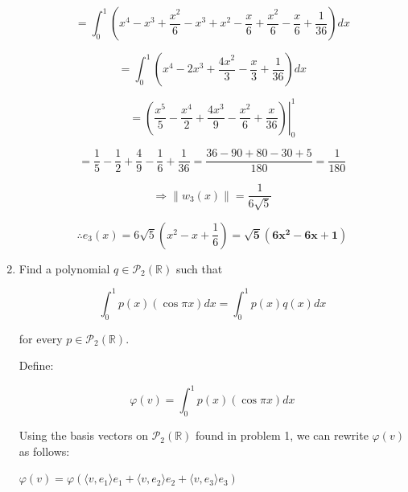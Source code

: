 \documentclass[fleqn]{article}
\newcommand{\norm}[1]{\left \lVert #1 \right \rVert}
\begin{document}
\begin{enumerate}[nolistsep]
		\begin{equation*}
			= \int_{0}^{1}{\left(x^4 - x^3 + \frac{x^2}{6} - x^3 + x^2 - \frac{x}{6} + \frac{x^2}{6} - \frac{x}{6} + \frac{1}{36}\right)dx}
		\end{equation*}
		
		\begin{equation*}
			= \int_{0}^{1}{\left(x^4 - 2x^3 + \frac{4x^2}{3} - \frac{x}{3} + \frac{1}{36}\right)dx}
		\end{equation*}
		
		\begin{equation*}
			= \left.\left(\frac{x^5}{5} - \frac{x^4}{2} + \frac{4x^3}{9} - \frac{x^2}{6} + \frac{x}{36}\right)\right\vert_{0}^{1}
		\end{equation*}
		
		\begin{equation*}
			= \frac{1}{5} - \frac{1}{2} + \frac{4}{9} - \frac{1}{6} + \frac{1}{36} = \frac{36 - 90 + 80 - 30 + 5}{180} = \frac{1}{180}
		\end{equation*}
		
		\begin{equation*}
			\Rightarrow \norm{w_3(x)} = \frac{1}{6\sqrt{5}}
		\end{equation*}
		
		\begin{equation*}
			\therefore e_3(x) = 6\sqrt{5}\left(x^2 - x + \frac{1}{6}\right) = \mathbf{ \sqrt{5}\left(6x^2 - 6x + 1\right)}
		\end{equation*}
		
		\pagebreak
		\item Find a polynomial $q \in \mathcal{P}_2(\mathbb{R})$ such that
		
		\begin{equation*}
			\int_{0}^{1}{p(x)(\cos{{\pi}x})dx} = \int_{0}^{1}{p(x)q(x)dx} 
		\end{equation*}
		
		for every $p \in \mathcal{P}_2(\mathbb{R})$.
		
		Define:
		
		\begin{equation*}
			\varphi(v) = \int_{0}^{1}{p(x)(\cos{{\pi}x})dx}
		\end{equation*}
		
		Using the basis vectors on $\mathcal{P}_2(\mathbb{R})$ found in problem 1, we can rewrite $\varphi(v)$ as follows:
		
		$\varphi(v) = \varphi(\langle v, e_1 \rangle e_1 + \langle v, e_2 \rangle e_2 + \langle v, e_3 \rangle e_3)$
		

\end{enumerate}
\end{document}
